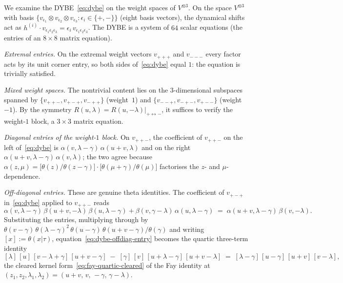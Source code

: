 \begin{computation}
\label{comp:dybe-matrix-entries}
We examine the DYBE~\eqref{eq:dybe} on the weight spaces of
$V^{\otimes 3}$. On the space $V^{\otimes 3}$
with basis $\{v_{\epsilon_1} \otimes v_{\epsilon_2}
\otimes v_{\epsilon_3} : \epsilon_i \in \{+,-\}\}$
(eight basis vectors), the dynamical shifts act as
$h^{(i)} \cdot v_{\epsilon_1\epsilon_2\epsilon_3}
= \epsilon_i\,v_{\epsilon_1\epsilon_2\epsilon_3}$.
The DYBE is a system of $64$ scalar equations (the entries of
an $8 \times 8$ matrix equation).

\emph{Extremal entries.}
On the extremal weight vectors $v_{+++}$ and $v_{---}$ every factor
acts by its unit corner entry, so both sides of~\eqref{eq:dybe} equal
$1$: the equation is trivially satisfied.

\emph{Mixed weight spaces.}
The nontrivial content lies on the $3$-dimensional subspaces
spanned by $\{v_{++-}, v_{+-+}, v_{-++}\}$ (weight~$1$)
and $\{v_{--+}, v_{-+-}, v_{+--}\}$ (weight~$-1$).
By the symmetry $R(u,\lambda) = R(u,-\lambda)|_{+\leftrightarrow -}$,
it suffices to verify the weight-$1$ block, a $3 \times 3$ matrix
equation.

\emph{Diagonal entries of the weight-$1$ block.}
On $v_{++-}$, the coefficient of $v_{++-}$ on the left
of~\eqref{eq:dybe} is
$\alpha(v,\lambda{-}\gamma)\,\alpha(u{+}v,\lambda)$ and on the right
$\alpha(u{+}v,\lambda{-}\gamma)\,\alpha(v,\lambda)$; the two agree
because $\alpha(z,\mu) =
\bigl[\theta(z)/\theta(z{-}\gamma)\bigr]\cdot
\bigl[\theta(\mu{+}\gamma)/\theta(\mu)\bigr]$
factorises the $z$- and $\mu$-dependence.

\emph{Off-diagonal entries.}
These are genuine theta identities. The coefficient of $v_{+-+}$
in~\eqref{eq:dybe} applied to $v_{++-}$ reads
\begin{equation}\label{eq:dybe-offdiag-entry}
\alpha(v,\lambda{-}\gamma)\,\beta(u{+}v,-\lambda)\,
\beta(u,\lambda{-}\gamma)
+ \beta(v,\gamma{-}\lambda)\,\alpha(u,\lambda{-}\gamma)
\;=\;
\alpha(u{+}v,\lambda{-}\gamma)\,\beta(v,-\lambda).
\end{equation}
Substituting the entries, multiplying through by
$\theta(v{-}\gamma)\,\theta(\lambda{-}\gamma)^2\,\theta(u{-}\gamma)\,
\theta(u{+}v{-}\gamma)/\theta(\gamma)$ and writing
$[x] := \theta(x|\tau)$, equation~\eqref{eq:dybe-offdiag-entry}
becomes the quartic three-term identity
\begin{equation}\label{eq:dybe-offdiag-quartic}
[\lambda]\,[u]\,[v{-}\lambda{+}\gamma]\,[u{+}v{-}\gamma]
\;-\; [\gamma]\,[v]\,[u{+}\lambda{-}\gamma]\,[u{+}v{-}\lambda]
\;=\; [\lambda{-}\gamma]\,[u{-}\gamma]\,[u{+}v]\,[v{-}\lambda],
\end{equation}
the cleared kernel form~\eqref{eq:fay-quartic-cleared} of the Fay
identity at $(z_1, z_2, \lambda_1, \lambda_2) =
(u{+}v,\, v,\, -\gamma,\, \gamma{-}\lambda)$.
\end{computation}

